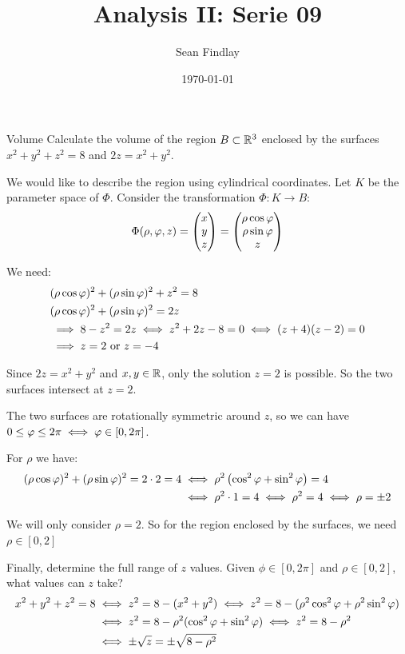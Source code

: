 \documentclass[12pt]{article}
\title{Analysis II: Serie 09}
\author{Sean Findlay}
\date{\today}
\begin{document}
\maketitle

\begin{problem}{Volume}{}
    Calculate the volume of the region $B \subset \mathbb{R}^3$ enclosed by the surfaces $x^2 + y^2 + z^2 = 8$ and $2z = x^2 + y^2$.
\end{problem}

We would like to describe the region using cylindrical coordinates. Let $K$ be the parameter space of $\Phi$. Consider the transformation $\Phi: K \rightarrow B$:
$$
    \Phi(\rho, \varphi, z) = \begin{pmatrix} x \\ y \\ z \end{pmatrix} = \begin{pmatrix} \rho \cos \varphi \\ \rho \sin \varphi \\ z \end{pmatrix}
$$

We need:
$$
\begin{aligned}
    &(\rho \cos \varphi)^2 + (\rho \sin \varphi)^2 + z^2 = 8 \\
    &(\rho \cos \varphi)^2 + (\rho \sin \varphi)^2 = 2z \\
    &\implies 8 - z^2 = 2z \iff z^2 + 2z - 8 = 0 \iff (z + 4)(z - 2) = 0 \\
    &\implies z = 2 \text { or } z = -4
\end{aligned}
$$

Since $2z = x^2 + y^2$ and $x, y \in \mathbb{R}$, only the solution $z = 2$ is possible. So the two surfaces intersect at $z = 2$.

The two surfaces are rotationally symmetric around $z$, so we can have $0 \leq \varphi \leq 2\pi \iff \varphi \in [0, 2\pi]$.

For $\rho$ we have:
$$
\begin{aligned}
    (\rho \cos \varphi)^2 + (\rho \sin \varphi)^2 = 2 \cdot 2 = 4 &\iff \rho^2\left( \cos^2\varphi + \sin^2\varphi \right) = 4 \\
    &\iff \rho^2 \cdot 1 = 4 \iff \rho^2 = 4 \iff \rho = \pm 2
\end{aligned}
$$

We will only consider $\rho = 2$. So for the region enclosed by the surfaces, we need $\rho \in [0, 2]$

Finally, determine the full range of $z$ values. Given $\phi \in [0, 2\pi]$ and $\rho \in [0, 2]$, what values can $z$ take?
$$
\begin{aligned}
    x^2 + y^2 + z^2 = 8 &\iff z^2 = 8 - (x^2 + y^2) \iff z^2 = 8 - (\rho^2\cos^2\varphi + \rho^2\sin^2\varphi) \\
    &\iff z^2 = 8 - \rho^2(\cos^2\varphi + \sin^2\varphi) \iff z^2 = 8 - \rho^2 \\
    &\iff \pm \sqrt{z} = \pm \sqrt{8 - \rho^2}
\end{aligned}
$$
\end{document}
